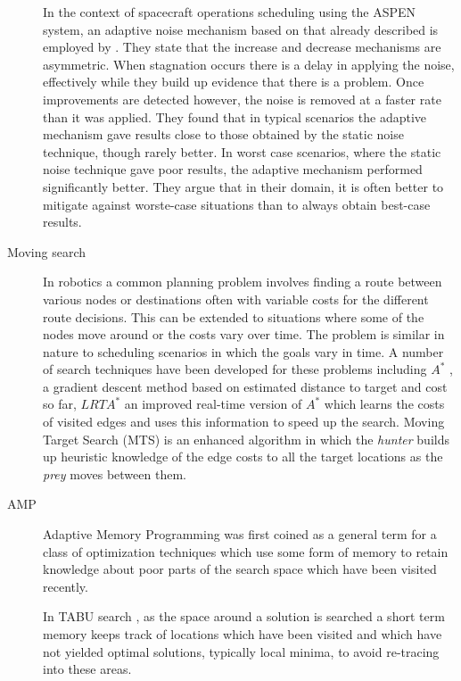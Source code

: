 \begin{description}
In the context of spacecraft operations scheduling using the ASPEN system, an adaptive noise mechanism based on that already described is employed by \citet{fukunaga04robust}. They state that the increase and decrease mechanisms are asymmetric. When stagnation occurs there is a delay in applying the noise, effectively while they build up evidence that there is a problem. Once improvements are detected however, the noise is removed at a faster rate than it was applied. They found that in typical scenarios the adaptive mechanism gave results close to those obtained by the static noise technique, though rarely better. In worst case scenarios, where the static noise technique gave poor results, the adaptive mechanism performed significantly better. They argue that in their domain, it is often better to mitigate against worste-case situations than to always obtain best-case results.

\item[Moving search]
In robotics a common planning problem involves finding a route between various nodes or destinations often with variable costs for the different route decisions. This can be extended to situations where some of the nodes move around or the costs vary over time. The problem is similar in nature to scheduling scenarios in which the goals vary in time. A number of search techniques have been developed for these problems including $A^*$ \citep{hart68formal}, a gradient descent method based on estimated distance to target and cost so far, $LRTA^*$ \citep{ishida96improving} an improved real-time version of $A^*$ which learns the costs of visited edges and uses this information to speed up the search. Moving Target Search (MTS) \citep{yokoo99search} is an enhanced algorithm in which the \emph{hunter} builds up heuristic knowledge of the edge costs to all the target locations as the \emph{prey} moves between them.

\item[AMP]
Adaptive Memory Programming \citep{taillard98adaptive} was first coined as a general term for a class of optimization techniques which use some form of memory to retain knowledge about poor parts of the search space which have been visited recently.

In TABU search \citep{glover99tabu}, as the space around a solution is searched a short term memory keeps track of locations which have been visited and which have not yielded optimal solutions, typically local minima, to avoid re-tracing into these areas. 



\end{description}
